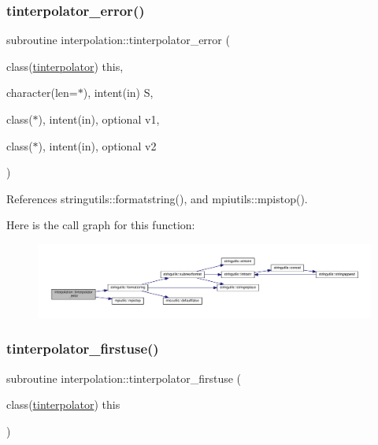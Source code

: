 \mbox{\label{namespaceinterpolation_a6dbf131728b481585c45c2564ba688b3}} 
\subsubsection{\texorpdfstring{tinterpolator\+\_\+error()}{tinterpolator\_error()}}
{\footnotesize\ttfamily subroutine interpolation\+::tinterpolator\+\_\+error (\begin{DoxyParamCaption}\item[{class(\mbox{\hyperlink{structinterpolation_1_1tinterpolator}{tinterpolator}})}]{this,  }\item[{character(len=$\ast$), intent(in)}]{S,  }\item[{class($\ast$), intent(in), optional}]{v1,  }\item[{class($\ast$), intent(in), optional}]{v2 }\end{DoxyParamCaption})}



References stringutils\+::formatstring(), and mpiutils\+::mpistop().

Here is the call graph for this function\+:
\nopagebreak
\begin{figure}[H]
\begin{center}
\leavevmode
\includegraphics[width=350pt]{namespaceinterpolation_a6dbf131728b481585c45c2564ba688b3_cgraph}
\end{center}
\end{figure}
\mbox{\label{namespaceinterpolation_a83d34895f7c29f6feb60dee74108123a}} 
\subsubsection{\texorpdfstring{tinterpolator\+\_\+firstuse()}{tinterpolator\_firstuse()}}
{\footnotesize\ttfamily subroutine interpolation\+::tinterpolator\+\_\+firstuse (\begin{DoxyParamCaption}\item[{class(\mbox{\hyperlink{structinterpolation_1_1tinterpolator}{tinterpolator}})}]{this }\end{DoxyParamCaption})}

